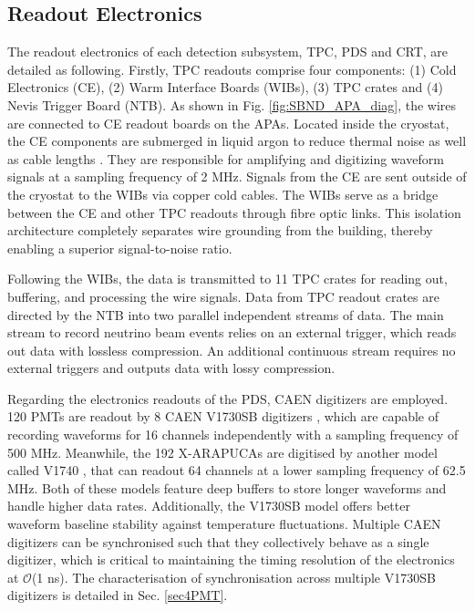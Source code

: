 \subsection{Readout Electronics}
\label{sec:readout}

The readout electronics of each detection subsystem, TPC, PDS and CRT, are detailed as following.
Firstly, TPC readouts comprise four components: (1) Cold Electronics (CE), (2) Warm Interface Boards (WIBs), (3) TPC crates and (4) Nevis Trigger Board (NTB).%
As shown in Fig. \ref{fig:SBND_APA_diag}, the wires are connected to CE readout boards on the APAs.
Located inside the cryostat, the CE components are submerged in liquid argon to reduce thermal noise as well as cable lengths \cite{SBND_CE}.
They are responsible for amplifying and digitizing waveform signals at a sampling frequency of 2 MHz. 
Signals from the CE are sent outside of the cryostat to the WIBs via copper cold cables.              
The WIBs serve as a bridge between the CE and other TPC readouts through fibre optic links.
This isolation architecture completely separates wire grounding from the building, thereby enabling a superior signal-to-noise ratio.

Following the WIBs, the data is transmitted to 11 TPC crates for reading out, buffering, and processing the wire signals. 
Data from TPC readout crates are directed by the NTB into two parallel independent streams of data.
The main stream to record neutrino beam events relies on an external trigger, which reads out data with lossless compression.
An additional continuous stream requires no external triggers and outputs data with lossy compression. 

Regarding the electronics readouts of the PDS, CAEN digitizers are employed. %
120 PMTs are readout by 8 CAEN V1730SB digitizers \cite{caen1730}, which are capable of recording waveforms for 16 channels independently with a sampling frequency of 500 MHz.
Meanwhile, the 192 X-ARAPUCAs are digitised by another model called V1740 \cite{caen1740}, that can readout 64 channels at a lower sampling frequency of 62.5 MHz.              
Both of these models feature deep buffers to store longer waveforms and handle higher data rates.
Additionally, the V1730SB model offers better waveform baseline stability against temperature fluctuations.
Multiple CAEN digitizers can be synchronised such that they collectively behave as a single digitizer, which is critical to maintaining the timing resolution of the electronics at $\mathcal{O}$(1 ns).
The characterisation of synchronisation across multiple V1730SB digitizers is detailed in Sec. \ref{sec4PMT}.

